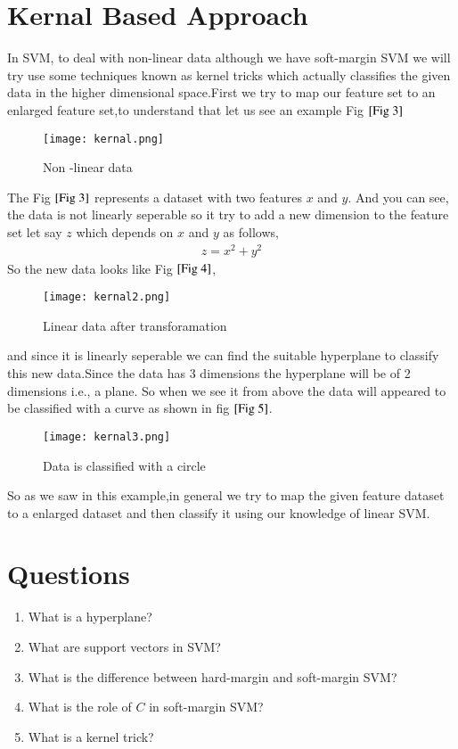 \documentclass[journal,12pt,onecolumn]{IEEEtran}
\theoremstyle{remark}
\numberwithin{equation}{section}
\begin{document}
            \section{Kernal Based Approach}
	     In SVM, to deal with non-linear data although we have soft-margin SVM we will try use some techniques known as kernel tricks which actually classifies the given data in the higher dimensional space.First we try to map our feature set to an enlarged feature set,to understand that let us see an example Fig $\ref{Fig 3}$\\
	         \begin{figure}
	           \centering
	           \texttt{[image: kernal.png]}
	           \caption{Non -linear data}
		   \label{Fig 3}
	         \end{figure}
     The Fig $\ref{Fig 3}$ represents a dataset with two features $x$ and $y$. And you can see, the data is not linearly seperable so it try to add a new dimension to the feature set let say $z$ which depends on $x$ and $y$ as follows,
                 \begin{align}
			z = x^2 + y^2
	         \end{align}
		 So the new data looks like Fig $\ref{Fig 4}$,
		  \begin{figure}
		   \centering
		   \texttt{[image: kernal2.png]}
		   \caption{Linear data after transforamation}
		   \label{Fig 4}
		  \end{figure}
	  and since it is linearly seperable we can find the suitable hyperplane to classify this new data.Since the data has 3 dimensions the hyperplane will be of 2 dimensions i.e., a plane.
            So when we see it from above the data will appeared to be classified with a curve as shown in fig $\ref{Fig 5}$.
	          \begin{figure}
		       \centering
	           \texttt{[image: kernal3.png]}
	           \caption{Data is classified with a circle}
		       \label{Fig 5}
		  \end{figure}
      So as we saw in this example,in general we try to map the given feature dataset to a enlarged dataset and then classify it using our knowledge of linear SVM.
             \section{Questions}
              \begin{enumerate}
	        \item What is a hyperplane?
	        \item What are support vectors in SVM?
	        \item What is the difference between hard-margin and soft-margin SVM?
		\item What is the role of $C$ in soft-margin SVM?
		\item What is a kernel trick?
	      \end{enumerate}
\end{document}

